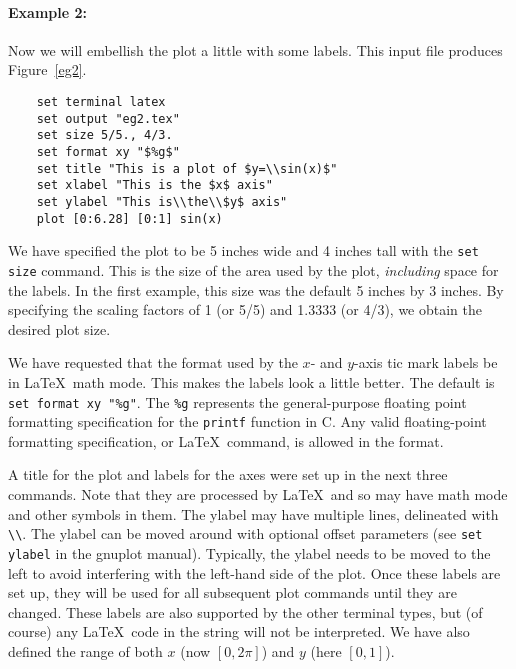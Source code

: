 \paragraph{Example 2:} Now we will embellish the plot a little with
some labels.  This input file produces Figure~\ref{eg2}.

\singlespace
\begin{verbatim}
    set terminal latex
    set output "eg2.tex"
    set size 5/5., 4/3.
    set format xy "$%g$"
    set title "This is a plot of $y=\\sin(x)$"
    set xlabel "This is the $x$ axis"
    set ylabel "This is\\the\\$y$ axis"
    plot [0:6.28] [0:1] sin(x)
\end{verbatim}
\currentspace


We have specified the plot to be 5 inches wide and 4 inches tall with
the {\tt set size} command. This is the size of the area used by the
plot, {\em including} space for the labels.  In the first example,
this size was the default 5 inches by 3 inches. By specifying the
scaling factors of 1 (or 5/5) and 1.3333 (or 4/3), we obtain the
desired plot size.

We have requested that the format used by the $x$- and $y$-axis tic
mark labels be in \LaTeX\ math mode. This makes the labels look a
little better. The default is \verb+set format xy "%g"+. The \verb+%g+
represents the general-purpose floating point formatting specification
for the {\tt printf} function in C. Any valid floating-point
formatting specification, or \LaTeX\ command, is allowed in the
format.

A title for the plot and labels for the axes were set up in the next
three commands.  Note that they are processed by \LaTeX\ and so may
have math mode and other symbols in them. The ylabel may have multiple
lines, delineated with \verb+\\+.  The ylabel can be moved around with
optional offset parameters (see {\tt set ylabel} in the gnuplot
manual). Typically, the ylabel needs to be moved to the left to avoid
interfering with the left-hand side of the plot.  Once these labels
are set up, they will be used for all subsequent plot commands until
they are changed. These labels are also supported by the other
terminal types, but (of course) any \LaTeX\ code in the string will
not be interpreted. We have also defined the range of both $x$ (now
$[0,2\pi]$) and $y$ (here $[0,1]$).

